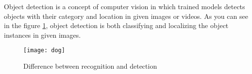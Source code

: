 \documentclass{article}
\begin{document}
\setlength{\parindent}{6ex}

\indent

Object detection is a concept of computer vision in which trained models 
detects objects with their category and location in given images or videos. 
As you can see in the figure \ref{fig:dog1}, object detection is both 
classifying and localizing the object instances in given images.

\begin{figure}
    \centering
    \texttt{[image: dog]}
    \caption{Difference between recognition and detection}
    \label{fig:dog1}
\end{figure}
\end{document}
